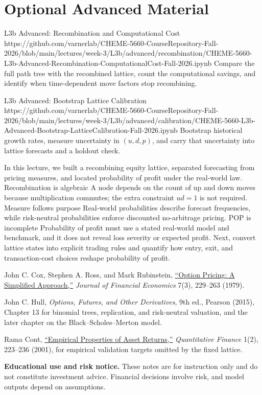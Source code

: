 \documentclass[11pt]{article}
\begin{document}
\section*{Optional Advanced Material}

\notebooklink
  {L3b Advanced: Recombination and Computational Cost}
  {https://github.com/varnerlab/CHEME-5660-CourseRepository-Fall-2026/blob/main/lectures/week-3/L3b/advanced/recombination/CHEME-5660-L3b-Advanced-Recombination-ComputationalCost-Fall-2026.ipynb}
  {Compare the full path tree with the recombined lattice, count the computational savings, and identify when time-dependent move factors stop recombining.}

\notebooklink
  {L3b Advanced: Bootstrap Lattice Calibration}
  {https://github.com/varnerlab/CHEME-5660-CourseRepository-Fall-2026/blob/main/lectures/week-3/L3b/advanced/calibration/CHEME-5660-L3b-Advanced-Bootstrap-LatticeCalibration-Fall-2026.ipynb}
  {Bootstrap historical growth rates, measure uncertainty in $(u,d,p)$, and carry that uncertainty into lattice forecasts and a holdout check.}

\newpage
\thispagestyle{fancy}
\keytakeaways
  {In this lecture, we built a recombining equity lattice, separated forecasting from pricing measures, and located probability of profit under the real-world law.}
  {Recombination is algebraic}
  {A node depends on the count of up and down moves because multiplication commutes; the extra constraint $ud=1$ is not required.}
  {Measure follows purpose}
  {Real-world probabilities describe forecast frequencies, while risk-neutral probabilities enforce discounted no-arbitrage pricing.}
  {POP is incomplete}
  {Probability of profit must use a stated real-world model and benchmark, and it does not reveal loss severity or expected profit.}
  {Next, convert lattice states into explicit trading rules and quantify how entry, exit, and transaction-cost choices reshape probability of profit.}

\begin{readinglist}
  \item John C. Cox, Stephen A. Ross, and Mark Rubinstein, \href{https://doi.org/10.1016/0304-405X(79)90015-1}{``Option Pricing: A Simplified Approach,''} \emph{Journal of Financial Economics} 7(3), 229--263 (1979).
  \item John C. Hull, \emph{Options, Futures, and Other Derivatives}, 9th ed., Pearson (2015), Chapter 13 for binomial trees, replication, and risk-neutral valuation, and the later chapter on the Black--Scholes--Merton model.
  \item Rama Cont, \href{https://doi.org/10.1080/713665670}{``Empirical Properties of Asset Returns,''} \emph{Quantitative Finance} 1(2), 223--236 (2001), for empirical validation targets omitted by the fixed lattice.
\end{readinglist}

\vfill
{\sffamily\footnotesize\color{vnmuted}\textbf{Educational use and risk notice.} These notes are for instruction only and do not constitute investment advice. Financial decisions involve risk, and model outputs depend on assumptions.}
\end{document}
